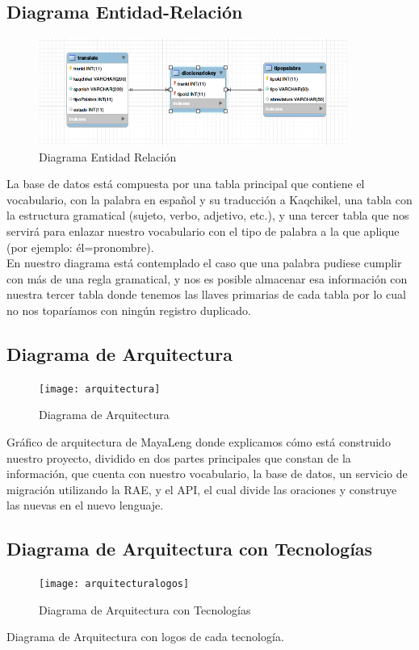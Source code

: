 \documentclass[a4paper,openright,11pt]{article}
\begin{document}
\subsection{Diagrama Entidad-Relación}
\begin{figure}[H]
	\centering
	\includegraphics[width=0.9\textwidth]{er}
	\caption{Diagrama Entidad Relación}
	\label{fig:er}
\end{figure}
La base de datos está compuesta por una tabla principal que contiene el vocabulario, con la palabra en español y su traducción a Kaqchikel, una tabla con la estructura gramatical (sujeto, verbo, adjetivo, etc.), y una tercer tabla que nos servirá para enlazar nuestro vocabulario con el tipo de palabra a la que aplique (por ejemplo: él=pronombre).\\
En nuestro diagrama está contemplado el caso que una palabra pudiese cumplir con más de una regla gramatical, y nos es posible almacenar esa información con nuestra tercer tabla donde tenemos las llaves primarias de cada tabla por lo cual no nos toparíamos con ningún registro duplicado.

\subsection{Diagrama de Arquitectura}
\begin{figure}[h]
	\centering
	\texttt{[image: arquitectura]}
	\caption{Diagrama de Arquitectura}
	\label{fig:arq}
\end{figure}

\newpage
Gráfico de arquitectura de MayaLeng donde explicamos cómo está construido nuestro proyecto, dividido en dos partes principales que constan de la información, que cuenta con nuestro vocabulario, la base de datos, un servicio de migración utilizando la RAE, y el API, el cual divide las oraciones y construye las nuevas en el nuevo lenguaje.

\subsection{Diagrama de Arquitectura con Tecnologías}
\begin{figure}[H]
	\centering
	\texttt{[image: arquitecturalogos]}
	\caption{Diagrama de Arquitectura con Tecnologías} 
	\label{fig:arqL}
\end{figure}
Diagrama de Arquitectura con logos de cada tecnología.
\end{document}
